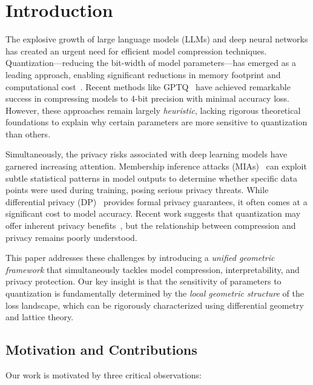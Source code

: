 \documentclass[letterpaper,twocolumn,10pt]{article}
\begin{document}
\section{Introduction}

The explosive growth of large language models (LLMs) and deep neural networks has created an urgent need for efficient model compression techniques. Quantization---reducing the bit-width of model parameters---has emerged as a leading approach, enabling significant reductions in memory footprint and computational cost~\cite{deng2020model}. Recent methods like GPTQ~\cite{frantar2022gptq} have achieved remarkable success in compressing models to 4-bit precision with minimal accuracy loss. However, these approaches remain largely \emph{heuristic}, lacking rigorous theoretical foundations to explain why certain parameters are more sensitive to quantization than others.

Simultaneously, the privacy risks associated with deep learning models have garnered increasing attention. Membership inference attacks (MIAs)~\cite{shokri2017membership} can exploit subtle statistical patterns in model outputs to determine whether specific data points were used during training, posing serious privacy threats. While differential privacy (DP)~\cite{dwork2014algorithmic} provides formal privacy guarantees, it often comes at a significant cost to model accuracy. Recent work suggests that quantization may offer inherent privacy benefits~\cite{yan2023privacy}, but the relationship between compression and privacy remains poorly understood.

This paper addresses these challenges by introducing a \emph{unified geometric framework} that simultaneously tackles model compression, interpretability, and privacy protection. Our key insight is that the sensitivity of parameters to quantization is fundamentally determined by the \emph{local geometric structure} of the loss landscape, which can be rigorously characterized using differential geometry and lattice theory.

\subsection{Motivation and Contributions}

Our work is motivated by three critical observations:
\end{document}
